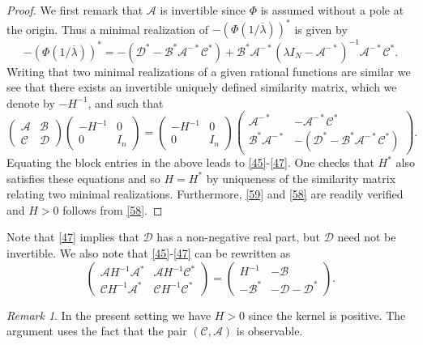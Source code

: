 \documentclass[12pt]{amsart}
\theoremstyle{definition}
\theoremstyle{remark}
\newtheorem{rem}[thm]{Remark}
\numberwithin{equation}{section}
\begin{document}
        \begin{proof}
          We first remark that $\mathscr A$ is invertible since $\Phi$ is assumed without a pole at the origin. Thus a minimal realization of $-(\Phi(1/\overline{{\lambda}}))^*$ is given by
          \begin{equation}
            -(\Phi(1/\overline{{\lambda}}))^*=-({\mathscr D}^*-{\mathscr B}^*{\mathscr A}^{-*}{\mathscr C}^*)+{\mathscr B}^*
              {\mathscr A}^{-*}({\lambda}I_N-{\mathscr A}^{-*})^{-1}{\mathscr A}^{-*}{\mathscr C^*}.
\end{equation}
Writing that two minimal realizations of a given rational functions are similar we see that there exists an invertible uniquely defined similarity matrix, which we
denote by $-H^{-1}$, and such that
\[
  \begin{pmatrix}{\mathscr A}&{\mathscr B}\\{\mathscr C}&{\mathscr D}\end{pmatrix}\begin{pmatrix}-H^{-1}&0\\0&I_n\end{pmatrix}=
  \begin{pmatrix}-H^{-1}&0\\0&I_n\end{pmatrix}\begin{pmatrix}{\mathscr A}^{-*}&-{\mathscr A}^{-*}\mathscr C^*\\
    {\mathscr B}^*{\mathscr A}^{-*}&-({\mathscr D}^*-{\mathscr B}^*{\mathscr A}^{-*}{\mathscr C^*})\end{pmatrix}.
\]
Equating the block entries in the above leads to \eqref{45}-\eqref{47}. One checks that $H^*$ also satisfies these equations and so $H=H^*$ by uniqueness of the similarity
matrix relating two minimal realizations. Furthermore, \eqref{59} and \eqref{58} are readily verified and $H>0$ follows from \eqref{58}.
          \end{proof}


 Note that \eqref{47} implies that $\mathscr D$ has a non-negative real part, but $\mathscr D$ need not be invertible. We also note that \eqref{45}-\eqref{47} can be rewritten
 as
 \[
   \begin{pmatrix}\mathscr{A}H^{-1}\mathscr{A}^*&\mathscr{A}H^{-1}\mathscr{C}^*\\
     \mathscr{ C}H^{-1}\mathscr{A}^*&\mathscr{C}H^{-1}\mathscr{C}^*\end{pmatrix}=\begin{pmatrix}H^{-1}&-\mathscr{B}\\ -\mathscr{B}^*&-\mathscr{D}-
     \mathscr{D}^*\end{pmatrix}.
 \]
 \begin{rem}
In the present setting we have $H>0$ since the kernel is positive. The argument uses the fact that the pair $(\mathscr C,\mathscr A)$ is observable.
\end{rem}
\end{document}
